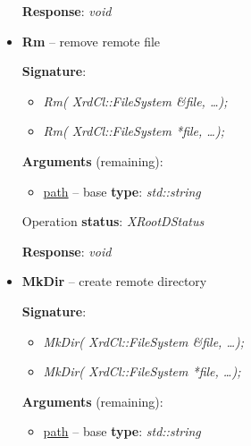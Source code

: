 \documentclass{article}
\begin{document}
\begin{itemize}
\begin{samepage}
                    \textbf{Response}: \textit{void}
                    
                \end{samepage}
                    
                \item \begin{samepage} \textbf{Rm} -- remove remote file

                    \textbf{Signature}:
                    \begin{itemize}
                        \item \textit{Rm( XrdCl::FileSystem \&file, \ldots);}
                        \item \textit{Rm( XrdCl::FileSystem *file, \ldots );}
                    \end{itemize}

                    \textbf{Arguments} (remaining):
                    \begin{itemize}
                        \item \underline{path} -- base \textbf{type}: \textit{std::string}
                    \end{itemize}

                    Operation \textbf{status}: \textit{XRootDStatus}

                    \textbf{Response}: \textit{void}
                    
                \end{samepage}
                    
                \item \begin{samepage} \textbf{MkDir} -- create remote directory

                    \textbf{Signature}:
                    \begin{itemize}
                        \item \textit{MkDir( XrdCl::FileSystem \&file, \ldots);}
                        \item \textit{MkDir( XrdCl::FileSystem *file, \ldots );}
                    \end{itemize}

                    \textbf{Arguments} (remaining):
                    \begin{itemize}
                        \item \underline{path} -- base \textbf{type}: \textit{std::string}
                    \end{itemize}


\end{samepage}
\end{itemize}
\end{document}
